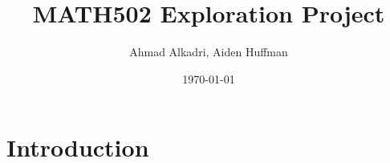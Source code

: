 \documentclass[10pt]{amsart}
\title{MATH502 Exploration Project}
\author[Ahmad Alkadri | 10147259, Aiden Huffman | ID]{Ahmad Alkadri, Aiden Huffman}
\date{\today}
\theoremstyle{plain}
\theoremstyle{definition}
\theoremstyle{remark}
\begin{document}
\maketitle

\begin{abstract}

\end{abstract}

\tableofcontents
\newpage
\section{Introduction}





\nocite{*}


\end{document}

